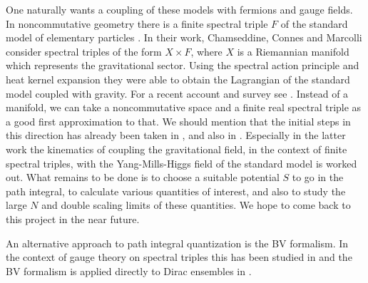 \documentclass[10pt]{article}
\begin{document}
One naturally wants a coupling  of these models with fermions and gauge fields. In noncommutative geometry there is a  finite spectral triple $F$ of the standard model of elementary particles \cite{QFTNCG, VS}. In their   work,   Chamseddine, Connes and Marcolli \cite{Neutrino Mixing}  consider spectral triples of the form $X \times F$, where $X$ is a Riemannian manifold  which  represents the gravitational sector.   Using the spectral action principle \cite{Spectral action} and heat kernel expansion they were able to obtain the Lagrangian of the standard model coupled with gravity. For a recent account and survey see \cite{Advances in NCG}.  Instead of a manifold,  we can take  a noncommutative space and a finite real spectral triple as  a good first approximation to that.  We should mention that the initial steps in this direction has already been taken in \cite{Gesteau}, and also in \cite{Sanchez3}. Especially in the latter work the kinematics of coupling  the gravitational field, in the context of finite spectral triples, with the Yang-Mills-Higgs  field of the standard model is worked out. What remains to be done is to choose a suitable potential $S$  to go in the path integral, to  calculate various quantities of interest, and also to study the large $N$ and double scaling limits of these quantities. We hope to come back to this project  in the  near future. 

An alternative approach to path integral quantization is the BV formalism. In the context of gauge theory on spectral triples this has been studied in \cite{BV Iseppi} and the BV formalism is applied directly to Dirac ensembles in \cite{BV nottingham}.
\end{document}
